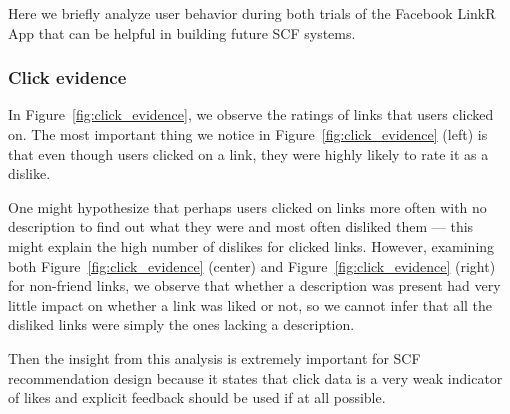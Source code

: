 \label{sec:behavior}

Here we briefly analyze user behavior during both trials of the Facebook
LinkR App that can be helpful in building future SCF systems.

\subsubsection{Click evidence}

In Figure~\ref{fig:click_evidence}, we observe the ratings of links
that users clicked on.  The most important thing we notice in 
Figure~\ref{fig:click_evidence} (left) is that even though users
clicked on a link, they were highly likely to rate it as a dislike.

One might hypothesize that perhaps users clicked on links more often with
no description to find out what they were and most often disliked them ---
this might explain the high number of dislikes for clicked links.  However,
examining both 
Figure~\ref{fig:click_evidence} (center) and 
Figure~\ref{fig:click_evidence} (right)
for non-friend links, we observe that whether a description was present
had very little impact on whether a link was liked or not, so we cannot
infer that all the disliked links were simply the ones lacking a description.

Then the insight from this analysis is extremely important 
for SCF recommendation design because it states that click data is a very
weak indicator of likes and explicit feedback should be used if at all
possible.

